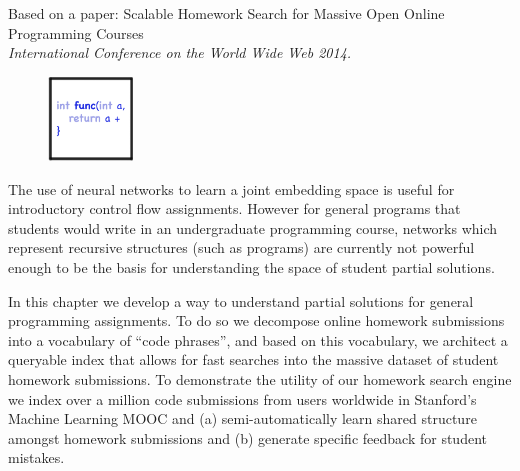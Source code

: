 Based on a paper: Scalable Homework Search for Massive Open
Online Programming Courses \cite{nguyen2014codewebs}\\ \emph{International Conference on the World Wide Web 2014.}

\vspace{7mm}

\begin{figure}[h!]
\includegraphics[width=0.2\textwidth]{img/assnType_4}
\end{figure}

\vspace{7mm}

The use of neural networks to learn a joint embedding space is useful for introductory control flow assignments. However for general programs that students would write in an undergraduate programming course, networks which represent recursive structures (such as programs) are currently not powerful enough to be the basis for understanding the space of student partial solutions.

In this chapter we develop a way to understand partial solutions for general programming assignments. To do so we decompose online homework submissions into a vocabulary of ``code phrases'', and based on this vocabulary, we architect a queryable index that allows for fast searches into the massive dataset of student homework submissions. To demonstrate the utility of our homework search engine we index over a million code submissions from users worldwide in Stanford's Machine Learning MOOC and (a) semi-automatically learn shared structure amongst homework submissions and (b)  generate specific feedback for student mistakes. 



